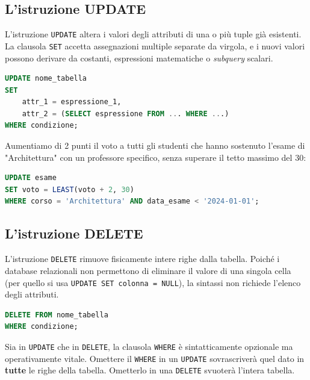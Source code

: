 \subsection{L'istruzione UPDATE}

L'istruzione \texttt{UPDATE} altera i valori degli attributi di una o più tuple già esistenti. La clausola \texttt{SET} accetta assegnazioni multiple separate da virgola, e i nuovi valori possono derivare da costanti, espressioni matematiche o \textit{subquery} scalari.

\begin{lstlisting}[language=SQL, basicstyle=\ttfamily\small, keywordstyle=\color{blue}\bfseries]
UPDATE nome_tabella
SET 
    attr_1 = espressione_1,
    attr_2 = (SELECT espressione FROM ... WHERE ...)
WHERE condizione;
\end{lstlisting}

\begin{example}
Aumentiamo di 2 punti il voto a tutti gli studenti che hanno sostenuto l'esame di "Architettura" con un professore specifico, senza superare il tetto massimo del 30:
\begin{lstlisting}[language=SQL, basicstyle=\ttfamily\small, keywordstyle=\color{blue}\bfseries]
UPDATE esame
SET voto = LEAST(voto + 2, 30)
WHERE corso = 'Architettura' AND data_esame < '2024-01-01';
\end{lstlisting}
\end{example}

\subsection{L'istruzione DELETE}

L'istruzione \texttt{DELETE} rimuove fisicamente intere righe dalla tabella. Poiché i database relazionali non permettono di eliminare il valore di una singola cella (per quello si usa \texttt{UPDATE SET colonna = NULL}), la sintassi non richiede l'elenco degli attributi.

\begin{lstlisting}[language=SQL, basicstyle=\ttfamily\small, keywordstyle=\color{blue}\bfseries]
DELETE FROM nome_tabella
WHERE condizione;
\end{lstlisting}

\begin{warningbox}
Sia in \texttt{UPDATE} che in \texttt{DELETE}, la clausola \texttt{WHERE} è sintatticamente opzionale ma operativamente vitale. Omettere il \texttt{WHERE} in un \texttt{UPDATE} sovrascriverà quel dato in \textbf{tutte} le righe della tabella. Ometterlo in una \texttt{DELETE} svuoterà l'intera tabella.
\end{warningbox}

